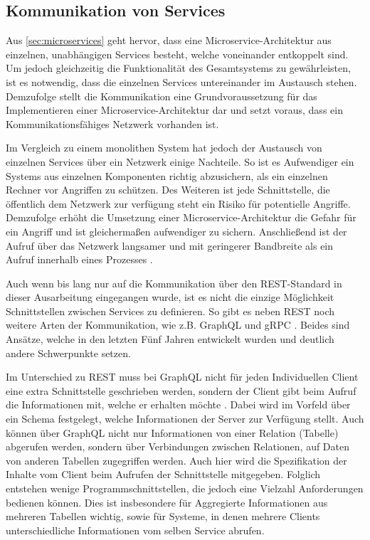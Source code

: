 \subsection{Kommunikation von Services}
\label{sec:kommunikation}

Aus \cref{sec:microservices} geht hervor, dass eine Microservice-Architektur aus einzelnen, unabhängigen Services besteht, welche voneinander entkoppelt sind. Um jedoch gleichzeitig die Funktionalität des Gesamtsystems zu gewährleisten, ist es notwendig, dass die einzelnen Services untereinander im Austausch stehen. Demzufolge stellt die Kommunikation eine Grundvoraussetzung für das Implementieren einer Microservice-Architektur dar und setzt voraus, dass ein Kommunikationsfähiges Netzwerk vorhanden ist.

Im Vergleich zu einem monolithen System hat jedoch der Austausch von einzelnen Services über ein Netzwerk einige Nachteile. So ist es Aufwendiger ein Systems aus einzelnen Komponenten richtig abzusichern, als ein einzelnen Rechner vor Angriffen zu schützen. Des Weiteren ist jede Schnittstelle, die öffentlich dem Netzwerk zur verfügung steht ein Risiko für potentielle Angriffe. Demzufolge erhöht die Umsetzung einer Microservice-Architektur die Gefahr für ein Angriff und ist gleichermaßen aufwendiger zu sichern. Anschließend ist der Aufruf über das Netzwerk langsamer und mit geringerer Bandbreite als ein Aufruf innerhalb eines Prozesses \parencite[vgl.][Kap. 6.1]{wolff_microservices_2018}.

Auch wenn bis lang nur auf die Kommunikation über den REST-Standard in dieser Ausarbeitung eingegangen wurde, ist es nicht die einzige Möglichkeit Schnittstellen zwischen Services zu definieren. So gibt es neben REST noch weitere Arten der Kommunikation, wie z.B. GraphQL \parencite{graphql_docs} und gRPC \parencite{grpc_docs}. Beides sind Ansätze, welche in den letzten Fünf Jahren entwickelt wurden und deutlich andere Schwerpunkte setzen.

Im Unterschied zu REST muss bei GraphQL nicht für jeden Individuellen Client eine extra Schnittstelle geschrieben werden, sondern der Client gibt beim Aufruf die Informationen mit, welche er erhalten möchte \parencite[vgl.][]{graphql_docs}. Dabei wird im Vorfeld über ein Schema festgelegt, welche Informationen der Server zur Verfügung stellt. Auch können über GraphQL nicht nur Informationen von einer Relation (Tabelle) abgerufen werden, sondern über Verbindungen zwischen Relationen, auf Daten von anderen Tabellen zugegriffen werden. Auch hier wird die Spezifikation der Inhalte vom Client beim Aufrufen der Schnittstelle mitgegeben. Folglich entstehen wenige Programmschnittstellen, die jedoch eine Vielzahl Anforderungen bedienen können. Dies ist insbesondere für Aggregierte Informationen aus mehreren Tabellen wichtig, sowie für Systeme, in denen mehrere Clients unterschiedliche Informationen vom selben Service abrufen.

